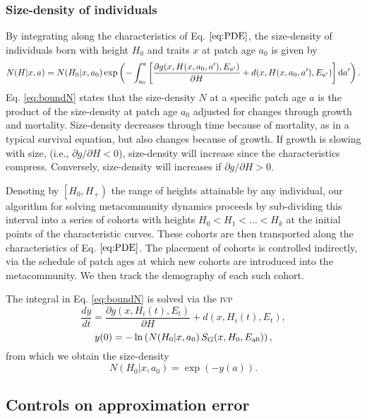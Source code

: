 \documentclass[10pt,twoside]{article}
\begin{document}
\subsubsection{Size-density of individuals}\label{density-of-individuals}

By integrating along the characteristics of Eq. \(\ref{eq:PDE}\),
the size-density of individuals born with height \(H_0\) and traits \(x\) at patch age \(a_{0}\) is given by
\citep{Deroos-1997}
\begin{equation}\label{eq:boundN}
N(H | x, a) = N(H_0 | x, a_0)
\exp \left( - \int _{a_0}^{a} \left[\frac{\partial g(x, H(x, a_0, a^\prime), E_{a^\prime})}{\partial H} + d(x, H(x, a_0, a^\prime), E_{a^\prime})\right] {\rm d} a^\prime \right).
\end{equation}
Eq. \ref{eq:boundN} states that the size-density \(N\) at a specific patch age \(a\) is
the product of the size-density at patch age \(a_{0}\) adjusted for changes through
growth and mortality. Size-density decreases through time because of
mortality, as in a typical survival equation, but also changes
because of growth. If growth is slowing with size, (i.e.,
\(\partial g / \partial H < 0\)), size-density will increase since the
characteristics compress. Conversely, size-density will increases if
\(\partial g / \partial H > 0\).

Denoting by \(\left[H_0, H_{ + } \right)\) the range of heights
attainable by any individual, our algorithm for solving metacommunity dynamics proceeds by sub-dividing
this interval into a series of cohorts with heights
\(H_0 < H_1 < \ldots < H_k\) at the initial points of the characteristic curves. These cohorts are then transported along
the characteristics of Eq. \(\ref{eq:PDE}\). The placement of cohorts
is controlled indirectly, via the schedule of patch ages at which
new cohorts are introduced into the metacommunity. We then track the
demography of each such cohort.

The integral in Eq. \ref{eq:boundN} is solved via the \textsc{ivp}
\[\frac{dy}{dt} = \frac{\partial g(x, H_i(t), E_t)}{\partial H} + d(x, H_i(t), E_t),\]
\[ y(0) = - \ln\left(N(H_0 | x, a_0) \, S_{\rm G} (x, H_0, E_{{\rm a}0}) \right),\]
from which we obtain the size-density
\[N(H_0 | x, a_0) = \exp( - y(a)).\]

\subsection{Controls on approximation error}
\end{document}
